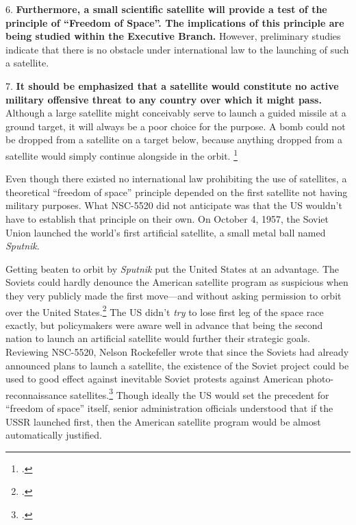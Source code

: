\documentclass[14pt]{extarticle}
\begin{document}
\begin{quoteblock}
6. \textelp{} \textbf{Furthermore, a small scientific satellite will provide a test of the principle of “Freedom of Space”. The implications of this principle are being studied within the Executive Branch.} However, preliminary studies indicate that there is no obstacle under international law to the launching of such a satellite.

7. \textbf{It should be emphasized that a satellite would constitute no active military offensive threat to any country over which it might pass.} Although a large satellite might conceivably serve to launch a guided missile at a ground target, it will always be a poor choice for the purpose. A bomb could not be dropped from a satellite on a target below, because anything dropped from a satellite would simply continue alongside in the orbit. \footcite{nsc_planning_board_draft_1955}
\newline
\end{quoteblock}


Even though there existed no international law prohibiting the use of satellites, a theoretical ``freedom of space'' principle depended on the first satellite not having military purposes. What NSC-5520 did not anticipate was that the US wouldn't have to establish that principle on their own. On October 4, 1957, the Soviet Union launched the world's first artificial satellite, a small metal ball named \emph{Sputnik}.

Getting beaten to orbit by \emph{Sputnik} put the United States at an advantage. The Soviets could hardly denounce the American satellite program as suspicious when they very publicly made the first move---and without asking permission to orbit over the United States.\footcite[p.~40]{peebles_corona_1997} The US didn't \emph{try} to lose first leg of the space race exactly, but policymakers were aware well in advance that being the second nation to launch an artificial satellite would further their strategic goals. Reviewing NSC-5520, Nelson Rockefeller wrote that since the Soviets had already announced plans to launch a satellite, the existence of the Soviet project could be used to good effect against inevitable Soviet protests against American photo-reconnaissance satellites.\footcite[p.~120]{mcdougall_heavens_1985} Though ideally the US would set the precedent for ``freedom of space'' itself, senior administration officials understood that if the USSR launched first, then the American satellite program would be almost automatically justified.
\end{document}
